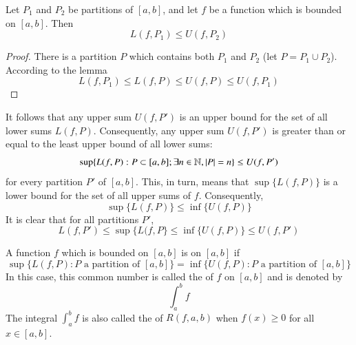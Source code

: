 \documentclass[12pt, a4paper, oneside, openright, titlepage]{book}
\begin{document}
\begin{thm}
    Let $P_1$ and $P_2$ be partitions of $[a,b]$, and let $f$ be a function which is bounded on $[a,b]$. Then \begin{equation}
        L(f,P_1) \leq U(f,P_2)
    \end{equation}
\end{thm}
\begin{proof}
    There is a partition $P$ which contains both $P_1$ and $P_2$ (let $P = P_1 \cup P_2$). According to the lemma \begin{equation*}
        L(f,P_1) \leq L(f,P) \leq U(f,P) \leq U(f,P_1)
    \end{equation*}
\end{proof}

\begin{rmk}
    It follows that any upper sum $U(f,P')$ is an upper bound for the set of all lower sums $L(f,P)$. Consequently, any upper sum $U(f,P')$     is greater than or equal to the least upper bound of all lower sums:\begin{equation}
        \sup\{L(f,P):P\subset [a,b];\exists n \in \mathbb N,|P| = n\} \leq U(f,P')
    \end{equation}
    for every partition $P'$ of $[a,b]$. This, in turn, means that $\sup\{L(f,P)\}$ is a lower bound for the set of all upper sums of $f$.      Consequently, \begin{equation}
        \sup\{L(f,P)\} \leq \inf\{U(f,P)\}
    \end{equation}
    It is clear that for all partitions $P'$, \begin{equation}
        L(f,P') \leq \sup\{L(f,P\} \leq \inf\{U(f,P)\} \leq U(f,P')
    \end{equation}
\end{rmk}

\begin{defn}
    A function $f$ which is bounded on $[a,b]$ is  on $[a,b]$ if $$\sup\{L(f,P):P\text{ a partition of } [a,b]\} =
    \inf\{U(f,P):P\text{ a partition of } [a,b]\}$$
    In this case, this common number is called the  of $f$ on $[a,b]$ and is denoted by \begin{equation}                             \int_a^bf
    \end{equation}
    The integral $\int_a^bf$ is also called the  of $R(f,a,b)$ when $f(x) \geq 0$ for all $x \in [a,b]$.
\end{defn}
\end{document}
